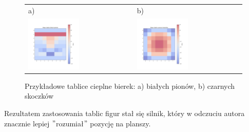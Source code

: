 \begin{figure}[ht]
    \centering
    \begin{tabular}{@{}ll@{}}
        a) & b) \\
        \includegraphics[width=0.5\textwidth]{rozdzialy/rozdzial02/2_ulepszenia_oceny/rysunki/bialePiony}
        &
        \includegraphics[width=0.5\textwidth]{rozdzialy/rozdzial02/2_ulepszenia_oceny/rysunki/czarneSkoczki}
    \end{tabular}
    \caption{Przykładowe tablice cieplne bierek: a) białych pionów, b) czarnych skoczków}
    \label{fig: tablice-figur}
\end{figure}

Rezultatem zastosowania tablic figur stał się silnik, który w odczuciu autora znacznie lepiej \("\)rozumiał\("\) pozycję na planszy.